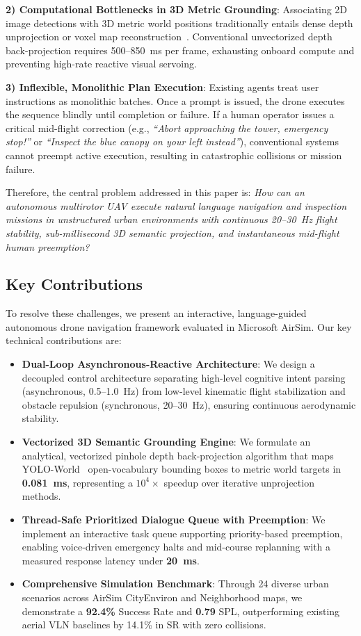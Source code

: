 \documentclass[conference]{IEEEtran}
\begin{document}
\noindent\textbf{2) Computational Bottlenecks in 3D Metric Grounding}: Associating 2D image detections with 3D metric world positions traditionally entails dense depth unprojection or voxel map reconstruction~\cite{kirillov2023sam,liu2023groundingdino}. Conventional unvectorized depth back-projection requires 500--850~ms per frame, exhausting onboard compute and preventing high-rate reactive visual servoing.

\noindent\textbf{3) Inflexible, Monolithic Plan Execution}: Existing agents treat user instructions as monolithic batches. Once a prompt is issued, the drone executes the sequence blindly until completion or failure. If a human operator issues a critical mid-flight correction (e.g., \textit{``Abort approaching the tower, emergency stop!''} or \textit{``Inspect the blue canopy on your left instead''}), conventional systems cannot preempt active execution, resulting in catastrophic collisions or mission failure.

Therefore, the central problem addressed in this paper is: \textit{How can an autonomous multirotor UAV execute natural language navigation and inspection missions in unstructured urban environments with continuous 20--30~Hz flight stability, sub-millisecond 3D semantic projection, and instantaneous mid-flight human preemption?}

\subsection{Key Contributions}
To resolve these challenges, we present an interactive, language-guided autonomous drone navigation framework evaluated in Microsoft AirSim. Our key technical contributions are:
\begin{itemize}
    \setlength{\itemsep}{1.5pt}
    \setlength{\parskip}{0pt}
	\item \textbf{Dual-Loop Asynchronous-Reactive Architecture}: We design a decoupled control architecture separating high-level cognitive intent parsing (asynchronous, 0.5--1.0~Hz) from low-level kinematic flight stabilization and obstacle repulsion (synchronous, 20--30~Hz), ensuring continuous aerodynamic stability.
	\item \textbf{Vectorized 3D Semantic Grounding Engine}: We formulate an analytical, vectorized pinhole depth back-projection algorithm that maps YOLO-World~\cite{cheng2024yoloworld} open-vocabulary bounding boxes to metric world targets in \textbf{0.081~ms}, representing a $10^4\times$ speedup over iterative unprojection methods.
	\item \textbf{Thread-Safe Prioritized Dialogue Queue with Preemption}: We implement an interactive task queue supporting priority-based preemption, enabling voice-driven emergency halts and mid-course replanning with a measured response latency under \textbf{20~ms}.
	\item \textbf{Comprehensive Simulation Benchmark}: Through 24 diverse urban scenarios across AirSim CityEnviron and Neighborhood maps, we demonstrate a \textbf{92.4\%} Success Rate and \textbf{0.79} SPL, outperforming existing aerial VLN baselines by 14.1\% in SR with zero collisions.
\end{itemize}
\end{document}
